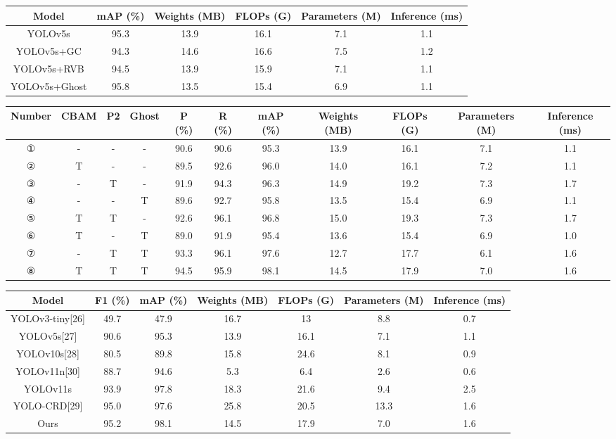 \documentclass[12pt, a4paper, twoside]{ctexart}
\begin{document}
\begin{table}[htbp]
\centering
\begin{tabular}{|c|c|c|c|c|c|}
\hline
Model & mAP
(\%) & Weights
(MB) & FLOPs
(G) & Parameters
(M) & Inference
(ms) \\
\hline
YOLOv5s & 95.3 & 13.9 & 16.1 & 7.1 & 1.1 \\
\hline
YOLOv5s+GC & 94.3 & 14.6 & 16.6 & 7.5 & 1.2 \\
\hline
YOLOv5s+RVB & 94.5 & 13.9 & 15.9 & 7.1 & 1.1 \\
\hline
YOLOv5s+Ghost & 95.8 & 13.5 & 15.4 & 6.9 & 1.1 \\
\hline
\end{tabular}
\end{table}

\begin{table}[htbp]
\centering
\begin{tabular}{|c|c|c|c|c|c|c|c|c|c|c|}
\hline
Number & CBAM & P2 & Ghost & P
(\%) & R
(\%) & mAP
(\%) & Weights
(MB) & FLOPs
(G) & Parameters
(M) & Inference
(ms) \\
\hline
① & - & - & - & 90.6 & 90.6 & 95.3 & 13.9 & 16.1 & 7.1 & 1.1 \\
\hline
② & T & - & - & 89.5 & 92.6 & 96.0 & 14.0 & 16.1 & 7.2 & 1.1 \\
\hline
③ & - & T & - & 91.9 & 94.3 & 96.3 & 14.9 & 19.2 & 7.3 & 1.7 \\
\hline
④ & - & - & T & 89.6 & 92.7 & 95.8 & 13.5 & 15.4 & 6.9 & 1.1 \\
\hline
⑤ & T & T & - & 92.6 & 96.1 & 96.8 & 15.0 & 19.3 & 7.3 & 1.7 \\
\hline
⑥ & T & - & T & 89.0 & 91.9 & 95.4 & 13.6 & 15.4 & 6.9 & 1.0 \\
\hline
⑦ & - & T & T & 93.3 & 96.1 & 97.6 & 12.7 & 17.7 & 6.1 & 1.6 \\
\hline
⑧ & T & T & T & 94.5 & 95.9 & 98.1 & 14.5 & 17.9 & 7.0 & 1.6 \\
\hline
\end{tabular}
\end{table}

\begin{table}[htbp]
\centering
\begin{tabular}{|c|c|c|c|c|c|c|}
\hline
Model & F1
(\%) & mAP
(\%) & Weights
(MB) & FLOPs
(G) & Parameters
(M) & Inference
(ms) \\
\hline
YOLOv3-tiny[26] & 49.7 & 47.9 & 16.7 & 13 & 8.8 & 0.7 \\
\hline
YOLOv5s[27] & 90.6 & 95.3 & 13.9 & 16.1 & 7.1 & 1.1 \\
\hline
YOLOv10s[28] & 80.5 & 89.8 & 15.8 & 24.6 & 8.1 & 0.9 \\
\hline
YOLOv11n[30] & 88.7 & 94.6 & 5.3 & 6.4 & 2.6 & 0.6 \\
\hline
YOLOv11s & 93.9 & 97.8 & 18.3 & 21.6 & 9.4 & 2.5 \\
\hline
YOLO-CRD[29] & 95.0 & 97.6 & 25.8 & 20.5 & 13.3 & 1.6 \\
\hline
Ours & 95.2 & 98.1 & 14.5 & 17.9 & 7.0 & 1.6 \\
\hline
\end{tabular}
\end{table}
\end{document}
